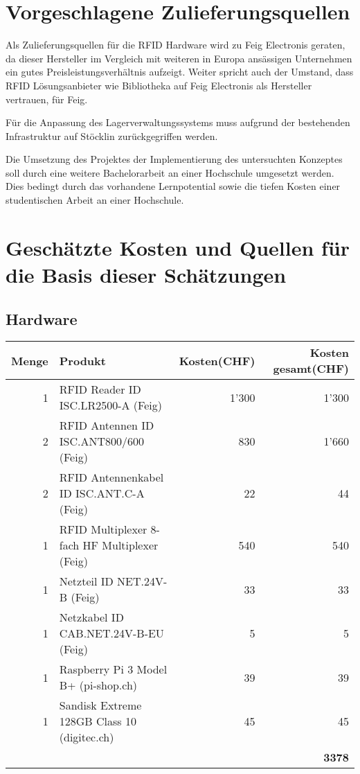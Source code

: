 \section{Vorgeschlagene Zulieferungsquellen}
Als Zulieferungsquellen für die RFID Hardware wird zu Feig Electronis geraten, da dieser Hersteller im Vergleich mit weiteren in Europa ansässigen Unternehmen ein gutes Preisleistungsverhältnis aufzeigt. Weiter spricht auch der Umstand, dass RFID Lösungsanbieter wie Bibliotheka auf Feig Electronis als Hersteller vertrauen, für Feig.

Für die Anpassung des Lagerverwaltungssystems muss aufgrund der bestehenden Infrastruktur auf Stöcklin zurückgegriffen werden.

Die Umsetzung des Projektes der Implementierung des untersuchten Konzeptes soll durch eine weitere Bachelorarbeit an einer Hochschule umgesetzt werden. Dies bedingt durch das vorhandene Lernpotential sowie die tiefen Kosten einer studentischen Arbeit an einer Hochschule.

\section{Geschätzte Kosten und Quellen für die Basis dieser Schätzungen}
\subsection{Hardware}
\begin{tabularx}{\textwidth}{|r|X|r|r|}
	\hline
	\textbf{Menge} & \textbf{Produkt} & \textbf{Kosten(CHF)} & \textbf{Kosten gesamt(CHF)} \\
	\hline
	1 & RFID Reader ID ISC.LR2500-A (Feig) & 1'300 & 1'300 \\
	\hline
	2 & RFID Antennen ID ISC.ANT800/600 (Feig)& 830 & 1'660 \\
	\hline
	2 & RFID Antennenkabel ID ISC.ANT.C-A (Feig) & 22 & 44 \\
	\hline
	1 & RFID Multiplexer 8-fach HF Multiplexer (Feig) & 540 & 540 \\
	\hline
	1 & Netzteil ID NET.24V-B (Feig) & 33 & 33 \\
	\hline
	1 & Netzkabel ID CAB.NET.24V-B-EU (Feig) & 5 & 5 \\
	\hline
	1 & Raspberry Pi 3 Model B+ (pi-shop.ch)& 39 & 39 \\
	\hline
	1 & Sandisk Extreme 128GB Class 10 (digitec.ch)& 45 & 45 \\
	\hline
	& & & \textbf{3378} \\
	\hline
\end{tabularx}

